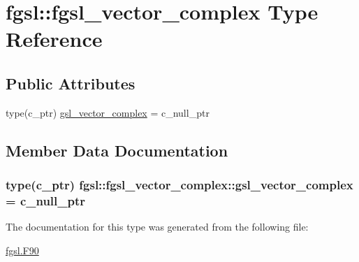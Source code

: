 \hypertarget{structfgsl_1_1fgsl__vector__complex}{\section{fgsl\-:\-:fgsl\-\_\-vector\-\_\-complex Type Reference}
\label{structfgsl_1_1fgsl__vector__complex}
}
\subsection*{Public Attributes}
\begin{DoxyCompactItemize}
\item 
type(c\-\_\-ptr) \hyperlink{structfgsl_1_1fgsl__vector__complex_a9fed96657e9f003cee00b0a7ad3c4412}{gsl\-\_\-vector\-\_\-complex} = c\-\_\-null\-\_\-ptr
\end{DoxyCompactItemize}


\subsection{Member Data Documentation}
\hypertarget{structfgsl_1_1fgsl__vector__complex_a9fed96657e9f003cee00b0a7ad3c4412}{
\subsubsection[{gsl\-\_\-vector\-\_\-complex}]{\setlength{\rightskip}{0pt plus 5cm}type(c\-\_\-ptr) fgsl\-::fgsl\-\_\-vector\-\_\-complex\-::gsl\-\_\-vector\-\_\-complex = c\-\_\-null\-\_\-ptr}}\label{structfgsl_1_1fgsl__vector__complex_a9fed96657e9f003cee00b0a7ad3c4412}


The documentation for this type was generated from the following file\-:\begin{DoxyCompactItemize}
\item 
\hyperlink{fgsl_8F90}{fgsl.\-F90}\end{DoxyCompactItemize}
